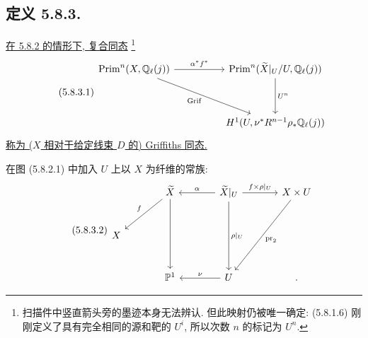 \subsection*{定义 5.8.3.}
\underline{在 5.8.2 的情形下, 复合同态}
\footnote{扫描件中竖直箭头旁的墨迹本身无法辨认. 但此映射仍被唯一确定: (5.8.1.6) 刚刚定义了具有完全相同的源和靶的 $U^i$, 所以次数 $n$ 的标记为 $U^n$.}
\begin{equation}\tag{5.8.3.1}
\begin{tikzcd}[column sep=huge,row sep=huge]
\operatorname{Prim}^n(X,\mathbb Q_\ell(j))
  \arrow[r,"\alpha^*f^*"]
  \arrow[dr,"\operatorname{Grif}"']
&
\operatorname{Prim}^n(\widetilde X|_U/U,\mathbb Q_\ell(j))
  \arrow[d,"U^n"]
\\
{}
&
H^1(U,\nu^*R^{n-1}\rho_*\mathbb Q_\ell(j))
\end{tikzcd}
\end{equation}
\underline{称为 ($X$ 相对于给定线束 $D$ 的) Griffiths 同态.}

在图 (5.8.2.1) 中加入 $U$ 上以 $X$ 为纤维的常族:
\begin{equation}\tag{5.8.3.2}
\begin{tikzcd}[row sep=large,column sep=large]
{}
&
\widetilde X
  \arrow[dl,"f"']
  \arrow[dd]
&
\widetilde X|_U
  \arrow[l,"\alpha"']
  \arrow[r,"f\times\rho|_U"]
  \arrow[dd,"\rho|_U"]
&
X\times U
  \arrow[ddl,"\operatorname{pr}_2"]
\\
X&{}&{}&{}
\\
{}
&
\mathbb P^1
&
U\arrow[l,"\nu"']
&
.
\end{tikzcd}
\end{equation}

